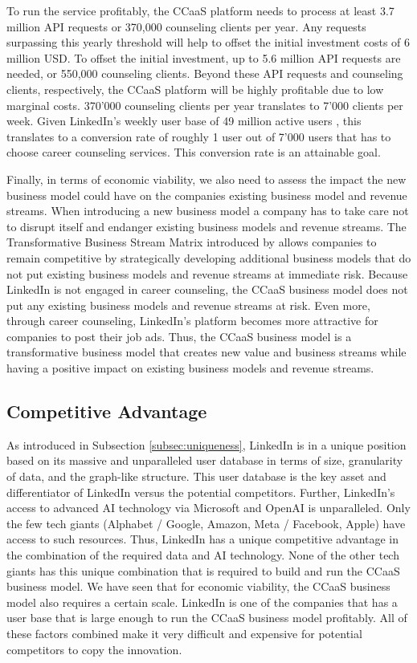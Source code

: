 To run the service profitably, the CCaaS platform needs to process at least 3.7 million API requests
or 370,000 counseling clients per year. Any requests surpassing this yearly threshold will help to offset
the initial investment costs of 6 million USD. To offset the initial investment, up to 5.6 million API requests
are needed, or 550,000 counseling clients. Beyond these API requests and counseling clients, respectively, the
CCaaS platform will be highly profitable due to low marginal costs. 370'000 counseling clients per year translates
to 7'000 clients per week. Given LinkedIn's weekly user base of 49 million active users \citep{kaserAIpoweredCareerCounseling2023},
this translates to a conversion rate of roughly 1 user out of 7'000 users that has to choose career counseling
services. This conversion rate is an attainable goal.

Finally, in terms of economic viability, we also need to assess the impact the new business model could 
have on the companies existing business model and revenue streams. When introducing a new business model 
a company has to take care not to disrupt itself and endanger existing business models and revenue streams.
The Transformative Business Stream Matrix introduced by \citet{schwafertsTransformativeBusinessStream2016}
allows companies to remain competitive by strategically developing additional business models that do not
put existing business models and revenue streams at immediate risk. Because LinkedIn is not engaged in 
career counseling, the CCaaS business model does not put any existing business models and revenue streams
at risk. Even more, through career counseling, LinkedIn's platform becomes more attractive for companies
to post their job ads. Thus, the CCaaS business model is a transformative business model that creates new
value and business streams while having a positive impact on existing business models and revenue streams.

\subsection{Competitive Advantage}

As introduced in Subsection \ref{subsec:uniqueness}, LinkedIn is in a unique position based on its massive 
and unparalleled user database in terms of size, granularity of data, and the graph-like structure. This user
database is the key asset and differentiator of LinkedIn versus the potential competitors. Further, LinkedIn's 
access to advanced AI technology via Microsoft and OpenAI is unparalleled. Only the few tech giants (Alphabet /
Google, Amazon, Meta / Facebook, Apple) have access to such resources. Thus, LinkedIn has a unique competitive
advantage in the combination of the required data and AI technology. None of the other tech giants has this unique 
combination that is required to build and run the CCaaS business model. We have seen that for economic viability,
the CCaaS business model also requires a certain scale. LinkedIn is one of the companies that has a user base
that is large enough to run the CCaaS business model profitably. All of these factors combined make it very   
difficult and expensive for potential competitors to copy the innovation.

